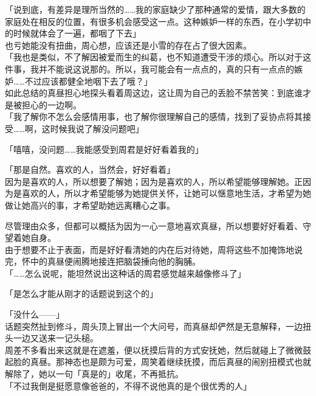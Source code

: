 「说到底，有差异是理所当然的……我的家庭缺少了那种通常的爱情，跟大多数的家庭处在相反的位置，有很多机会感受这一点。这种嫉妒一样的东西，在小学初中的时候就体会了一遍，都咽了下去」\\

也亏她能没有扭曲，周心想，应该还是小雪的存在占了很大因素。\\

「我也是类似，不了解因被爱而生的纠葛，也不知道遭受干涉的烦心。所以对于这件事，我并不能说这说那的。所以，我可能会有一点点的，真的只有一点点的嫉妒……不过应该都健全地咽下去了哦？」\\

如此总结的真昼担心地探头看着周这边，这让周为自己的丢脸不禁苦笑：到底谁才是被担心的一边啊。\\

「我了解你不怎么会感情用事，也了解你很理解自己的感情，找到了妥协点将其接受……啊，这时候我说了解没问题吧」

「嘻嘻，没问题……我能感受到周君是好好看着我的」

「那是自然。喜欢的人，当然会，好好看着」\\

因为是喜欢的人，所以想要了解她；因为是喜欢的人，所以希望能够理解她。正因为是喜欢的人，所以才希望能够为她提供关怀，让她可以惬意地生活，才希望为她做让她高兴的事，才希望助她远离糟心之事。

尽管理由众多，但都可以概括为因为一心一意地喜欢真昼，所以想要好好看着、守望着她自身。\\

由于想要不止于表面，而是好好看清她的内在后对待她，周将这些不加掩饰地说完，怀中的真昼便闹腾地接连把脑袋捶向他的胸脯。\\

「……怎么说呢，能坦然说出这种话的周君感觉越来越像修斗了」

「是怎么才能从刚才的话题说到这个的」

「没什么——」\\

话题突然扯到修斗，周头顶上冒出一个大问号，而真昼却俨然是无意解释，一边扭头一边又送来一记头槌。\\

周差不多看出来这就是在遮羞，便以抚摸后背的方式安抚她，然后就碰上了微微鼓起脸的真昼。那神态也是颇为可爱，周笑着继续抚摸，而后真昼的闹别扭模式也就解除了，她以一句「真是的」收尾，不再抵抗。\\

「不过我倒是挺愿意像爸爸的，不得不说他真的是个很优秀的人」

